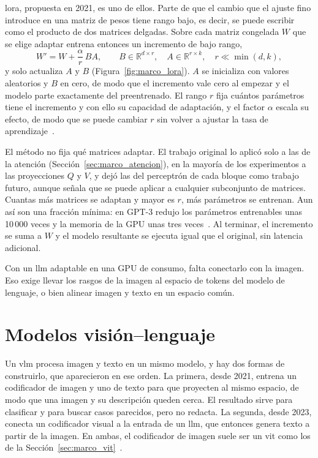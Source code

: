 \Gls{lora}, propuesta en 2021, es uno de ellos. Parte de que el cambio que el ajuste fino introduce en una
matriz de pesos tiene rango bajo, es decir, se puede escribir como el producto de dos matrices delgadas. Sobre
cada matriz congelada $W$ que se elige adaptar entrena entonces un incremento de bajo rango,
\begin{equation}
    W' = W + \frac{\alpha}{r}\,BA, \qquad B \in \mathbb{R}^{d\times r},\quad A \in \mathbb{R}^{r\times k},\quad
    r \ll \min(d, k),
    \label{eq:marco_lora}
\end{equation}
y solo actualiza $A$ y $B$ (Figura~\ref{fig:marco_lora}). $A$ se inicializa con valores aleatorios y $B$ en
cero, de modo que el incremento vale cero al empezar y el modelo parte exactamente del preentrenado. El rango
$r$ fija cuántos parámetros tiene el incremento y con ello su capacidad de adaptación, y el factor $\alpha$
escala su efecto, de modo que se puede cambiar $r$ sin volver a ajustar la tasa de
aprendizaje~\cite{hu2021lora}.



El método no fija qué matrices adaptar. El trabajo original lo aplicó solo a las de la atención
(Sección~\ref{sec:marco_atencion}), en la mayoría de los experimentos a las proyecciones $Q$ y $V$, y dejó las
del perceptrón de cada bloque como trabajo futuro, aunque señala que se puede aplicar a cualquier subconjunto de
matrices. Cuantas más matrices se adaptan y mayor es
$r$, más parámetros se entrenan. Aun así son una fracción mínima: en GPT-3 redujo los parámetros entrenables
unas 10\,000 veces y la memoria de la GPU unas tres veces~\cite{hu2021lora}. Al terminar, el incremento se suma
a $W$ y el modelo resultante se ejecuta igual que el original, sin latencia adicional.

Con un \gls{llm} adaptable en una GPU de consumo, falta conectarlo con la imagen. Eso exige llevar los rasgos
de la imagen al espacio de tokens del modelo de lenguaje, o bien alinear imagen y texto en un espacio común.

\section{Modelos visión--lenguaje}
\label{sec:marco_vlm}

Un \gls{vlm} procesa imagen y texto en un mismo modelo, y hay dos formas de construirlo, que aparecieron en
ese orden. La primera, desde 2021, entrena un codificador de imagen y uno de texto para que proyecten al mismo
espacio, de modo que una imagen y su descripción queden cerca. El resultado sirve para clasificar y para
buscar casos parecidos, pero no redacta. La segunda, desde 2023, conecta un codificador visual a la entrada de
un \gls{llm}, que entonces genera texto a partir de la imagen. En ambas, el codificador de imagen suele ser un
\gls{vit} como los de la Sección~\ref{sec:marco_vit}~\cite{radford2021learning,liu2023visual}.

